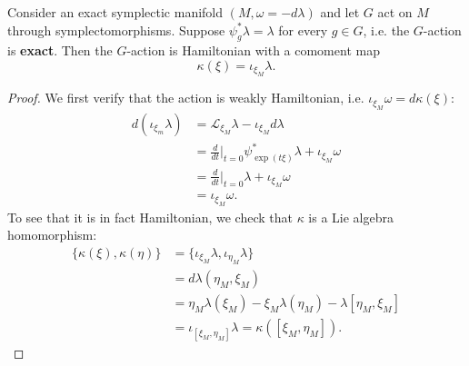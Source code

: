 \documentclass{amsart}
\begin{document}
\begin{proposition}
    Consider an exact symplectic manifold $(M,\omega=-d\lambda)$ and let $G$ act
    on $M$ through symplectomorphisms. Suppose $\psi_g^*\lambda=\lambda$ for every
    $g\in G$, i.e. the $G$-action is \textbf{exact}. Then the $G$-action is Hamiltonian
    with a comoment map
    \begin{equation*}
        \kappa(\xi) = \iota_{\xi_M}\lambda.
    \end{equation*}
    \label{prop:exact}
\end{proposition}
\begin{proof}
    We first verify that the action is weakly Hamiltonian, i.e. $\iota_{\xi_M}\omega = d\kappa(\xi)$:
    \begin{align*}
        d\left( \iota_{\xi_m}\lambda \right)&=\mathcal{L}_{\xi_M}\lambda - \iota_{\xi_M}d\lambda\\
        &=\frac{d}{dt}\bigg|_{t=0}\psi^*_{\exp(t\xi)}\lambda+\iota_{\xi_M}\omega\\
        &=\frac{d}{dt}\bigg|_{t=0}\lambda+\iota_{\xi_M}\omega\\
        &=\iota_{\xi_M}\omega.
    \end{align*}
    To see that it is in fact Hamiltonian, we check that $\kappa$ is a Lie algebra homomorphism:
    \begin{align*}
        \{\kappa(\xi),\kappa(\eta)\} &= \{\iota_{\xi_M}\lambda,\iota_{\eta_M}\lambda\}\\
        &= d\lambda(\eta_M,\xi_M)\\
        &=\eta_M\lambda(\xi_M) - \xi_M\lambda(\eta_M)-\lambda[\eta_M,\xi_M]\\
        &=\iota_{[\xi_M,\eta_M]}\lambda=\kappa([\xi_M,\eta_M]).
    \end{align*}
\end{proof}
\end{document}
